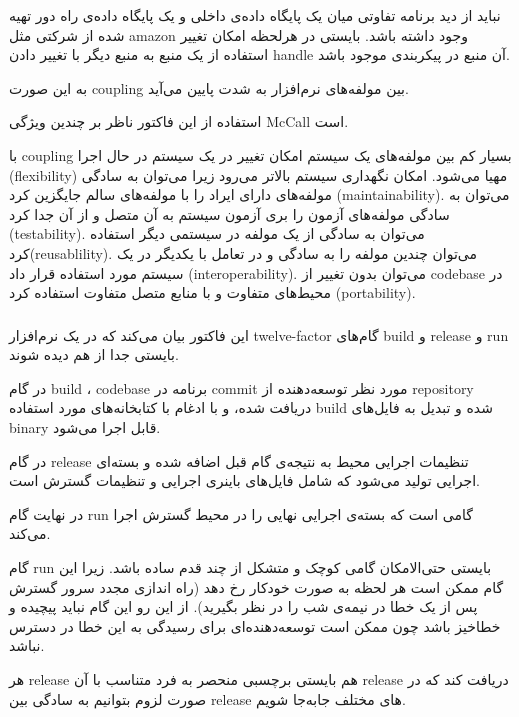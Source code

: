 نباید از دید برنامه تفاوتی میان یک پایگاه داده‌ی داخلی و یک پایگاه داده‌ی راه دور تهیه شده از شرکتی مثل amazon وجود داشته باشد. بایستی در هرلحظه امکان تغییر استفاده از یک منبع به منبع دیگر با تغییر دادن handle آن منبع در پیکربندی موجود باشد.

به این صورت coupling بین مولفه‌های نرم‌افزار به شدت پایین می‌آید.

استفاده از این فاکتور ناظر بر چندین ویژگی McCall است.

با coupling بسیار کم بین مولفه‌های یک سیستم امکان تغییر در یک سیستم در حال اجرا (flexibility) مهیا می‌شود. امکان نگهداری سیستم بالاتر می‌رود زیرا می‌توان به سادگی مولفه‌های دارای ایراد را با مولفه‌های سالم جایگزین کرد (maintainability). می‌توان به سادگی مولفه‌های آزمون را بری آزمون سیستم به آن متصل و از آن جدا کرد (testability). می‌توان به سادگی از یک مولفه در سیستمی دیگر استفاده کرد(reusablility). می‌توان چندین مولفه را به سادگی و در تعامل با یکدیگر در یک سیستم مورد استفاده قرار داد (interoperability). می‌توان بدون تغییر از codebase در محیط‌های متفاوت و با منابع متصل متفاوت استفاده کرد (portability).



\subsubsection{}
این فاکتور بیان می‌کند که در یک نرم‌افزار 
twelve-factor
گام‌های build و release و run بایستی جدا از هم دیده شوند.

در گام build
،
codebase
برنامه در commit مورد نظر توسعه‌دهنده از repository دریافت شده، و با ادغام با کتابخانه‌های مورد استفاده build شده و تبدیل به فایل‌های binary قابل اجرا می‌شود.

در گام release تنظیمات اجرایی محیط به نتیجه‌ی گام قبل اضافه شده و بسته‌ای اجرایی تولید می‌شود که شامل فایل‌های باینری اجرایی و تنظیمات گسترش است.

در نهایت گام run گامی است که بسته‌ی اجرایی نهایی را در محیط گسترش اجرا می‌کند.

گام run بایستی حتی‌الامکان گامی کوچک و متشکل از چند قدم ساده باشد. زیرا این گام ممکن است هر لحظه به صورت خودکار رخ دهد (راه اندازی مجدد سرور گسترش پس از یک خطا در نیمه‌ی شب را در نظر بگیرید). از این رو این گام نباید پیچیده و خطاخیز باشد چون ممکن است توسعه‌دهنده‌ای برای رسیدگی به این خطا در دسترس نباشد.

هر release هم بایستی برچسبی منحصر به فرد متناسب با آن release دریافت کند که در صورت لزوم بتوانیم به سادگی بین release های مختلف جابه‌جا شویم.


